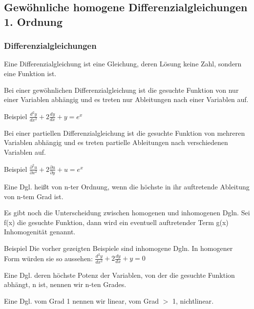 \documentclass[
	11pt, %
]{beamer}
\begin{document}
\subsection{Gew\"ohnliche homogene Differenzialgleichungen 1. Ordnung}
\begin{frame}
	\frametitle{Differenzialgleichungen}
	
	\begin{definition}
		Eine \alert{Differenzialgleichung} ist eine Gleichung, deren L\"osung keine Zahl, sondern eine Funktion ist. 
	\end{definition}
	\begin{definition}
		Bei einer \alert{gew\"ohnlichen Differenzialgleichung} ist die gesuchte Funktion von nur einer Variablen abh\"angig und es treten nur Ableitungen nach einer Variablen auf.
	\end{definition}
	\begin{exampleblock}{Beispiel}
		$	\frac{d^2y}{dx^2} + 2\frac{dy}{dx} + y = e^x$
	\end{exampleblock}
\end{frame}
\begin{frame}
	\begin{definition}
		Bei einer \alert{partiellen Differenzialgleichung} ist die gesuchte Funktion von mehreren Variablen abh\"angig und es treten partielle Ableitungen nach verschiedenen Variablen auf.
	\end{definition}
	\begin{exampleblock}{Beispiel}
		$\frac{\partial^2u}{\partial x^2} + 2\frac{\partial u}{\partial y} + u = e^x$
	\end{exampleblock}
	\begin{definition}
		Eine Dgl. heißt von \alert{n-ter Ordnung}, wenn die höchste in ihr auftretende Ableitung von n-tem Grad ist.
	\end{definition}
\end{frame}
\begin{frame}
	\begin{definition}
		Es gibt noch die Unterscheidung zwischen \alert{homogenen} und \alert{inhomogenen} Dgln. Sei f(x) die gesuchte Funktion, dann wird ein eventuell auftretender Term g(x) \alert{Inhomogenit\"at} genannt.
	\end{definition}
	\begin{exampleblock}{Beispiel}
		Die vorher gezeigten Beispiele sind inhomogene Dgln. In homogener Form w\"urden sie so aussehen:
		$	\frac{d^2y}{dx^2} + 2\frac{dy}{dx} + y = 0$
	\end{exampleblock}
\end{frame}
\begin{frame}
	\begin{definition}
		Eine Dgl. deren h\"ochste Potenz der Variablen, von der die gesuchte Funktion abh\"angt, n ist, nennen wir \alert{n-ten Grades}.
	\end{definition}
	\begin{definition}
		Eine Dgl. vom Grad 1 nennen wir \alert{linear}, vom Grad $>$ 1, \alert{nichtlinear}.
	\end{definition}
\end{frame}
\end{document}
